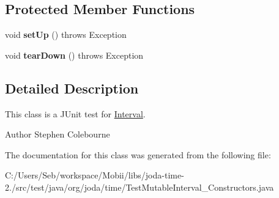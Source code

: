 \subsection*{Protected Member Functions}
\begin{DoxyCompactItemize}
\item 
\hypertarget{classorg_1_1joda_1_1time_1_1_test_mutable_interval___constructors_a89d661c4db7d97cca86225b81b316090}{void {\bfseries set\-Up} ()  throws Exception }\label{classorg_1_1joda_1_1time_1_1_test_mutable_interval___constructors_a89d661c4db7d97cca86225b81b316090}

\item 
\hypertarget{classorg_1_1joda_1_1time_1_1_test_mutable_interval___constructors_a1a49ab647bf0c1c0f20a7ac78dc43396}{void {\bfseries tear\-Down} ()  throws Exception }\label{classorg_1_1joda_1_1time_1_1_test_mutable_interval___constructors_a1a49ab647bf0c1c0f20a7ac78dc43396}

\end{DoxyCompactItemize}


\subsection{Detailed Description}
This class is a J\-Unit test for \hyperlink{classorg_1_1joda_1_1time_1_1_interval}{Interval}.

\begin{DoxyAuthor}{Author}
Stephen Colebourne 
\end{DoxyAuthor}


The documentation for this class was generated from the following file\-:\begin{DoxyCompactItemize}
\item 
C\-:/\-Users/\-Seb/workspace/\-Mobii/libs/joda-\/time-\/2./src/test/java/org/joda/time/Test\-Mutable\-Interval\-\_\-\-Constructors.\-java\end{DoxyCompactItemize}
